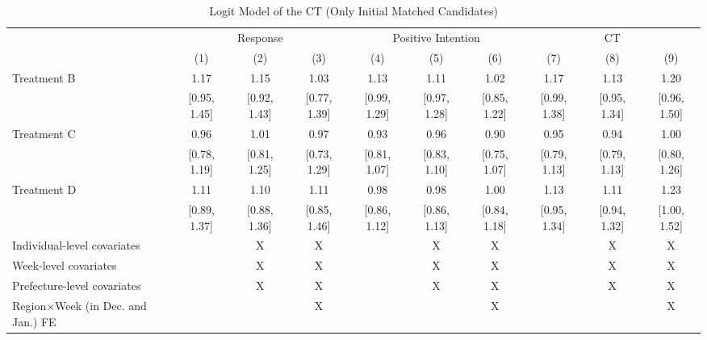 \documentclass[12pt, a4paper]{article}
\begin{document}
\begin{landscape}\begin{table}[H]

\caption{\label{tab:logit-reply-test-initial-matched}Logit Model of the CT (Only Initial Matched Candidates)}
\centering
\fontsize{8}{10}\selectfont
\begin{threeparttable}
\begin{tabular}[t]{lccccccccc}
\toprule
\multicolumn{1}{c}{ } & \multicolumn{3}{c}{Response} & \multicolumn{3}{c}{Positive Intention} & \multicolumn{3}{c}{CT} \\
\cmidrule(l{3pt}r{3pt}){2-4} \cmidrule(l{3pt}r{3pt}){5-7} \cmidrule(l{3pt}r{3pt}){8-10}
  & (1) & (2) & (3) & (4) & (5) & (6) & (7) & (8) & (9)\\
\midrule
Treatment B & \num{1.17} & \num{1.15} & \num{1.03} & \num{1.13} & \num{1.11} & \num{1.02} & \num{1.17} & \num{1.13} & \num{1.20}\\
 & {}[\num{0.95}, \num{1.45}] & {}[\num{0.92}, \num{1.43}] & {}[\num{0.77}, \num{1.39}] & {}[\num{0.99}, \num{1.29}] & {}[\num{0.97}, \num{1.28}] & {}[\num{0.85}, \num{1.22}] & {}[\num{0.99}, \num{1.38}] & {}[\num{0.95}, \num{1.34}] & {}[\num{0.96}, \num{1.50}]\\
Treatment C & \num{0.96} & \num{1.01} & \num{0.97} & \num{0.93} & \num{0.96} & \num{0.90} & \num{0.95} & \num{0.94} & \num{1.00}\\
 & {}[\num{0.78}, \num{1.19}] & {}[\num{0.81}, \num{1.25}] & {}[\num{0.73}, \num{1.29}] & {}[\num{0.81}, \num{1.07}] & {}[\num{0.83}, \num{1.10}] & {}[\num{0.75}, \num{1.07}] & {}[\num{0.79}, \num{1.13}] & {}[\num{0.79}, \num{1.13}] & {}[\num{0.80}, \num{1.26}]\\
Treatment D & \num{1.11} & \num{1.10} & \num{1.11} & \num{0.98} & \num{0.98} & \num{1.00} & \num{1.13} & \num{1.11} & \num{1.23}\\
 & {}[\num{0.89}, \num{1.37}] & {}[\num{0.88}, \num{1.36}] & {}[\num{0.85}, \num{1.46}] & {}[\num{0.86}, \num{1.12}] & {}[\num{0.86}, \num{1.13}] & {}[\num{0.84}, \num{1.18}] & {}[\num{0.95}, \num{1.34}] & {}[\num{0.94}, \num{1.32}] & {}[\num{1.00}, \num{1.52}]\\
\midrule
Individual-level covariates &  & X & X &  & X & X &  & X & X\\
Week-level covariates &  & X & X &  & X & X &  & X & X\\
Prefecture-level covariates &  & X & X &  & X & X &  & X & X\\
Region$\times$Week (in Dec. and Jan.) FE &  &  & X &  &  & X &  &  & X\\

\end{tabular}
\end{threeparttable}
\end{table}
\end{landscape}
\end{document}
